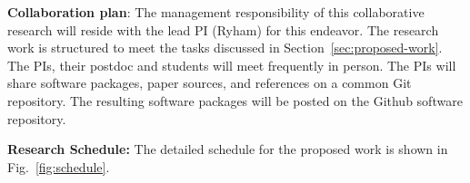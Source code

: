 \medskip

\textbf{Collaboration plan}: 
%
The management responsibility of this collaborative research will reside
with the lead PI (Ryham) for this endeavor. The research work is
structured to meet the tasks discussed in
Section~\ref{sec:proposed-work}.
%
The PIs, their postdoc and students will meet frequently in person.  The
PIs will share software packages, paper sources, and references on a
common \textsf{Git} repository. The resulting software packages will be
posted on the \textsf{Github} software repository.

\medskip

\textbf{Research Schedule:} The detailed schedule for the proposed work
is shown in Fig.~\ref{fig:schedule}.


